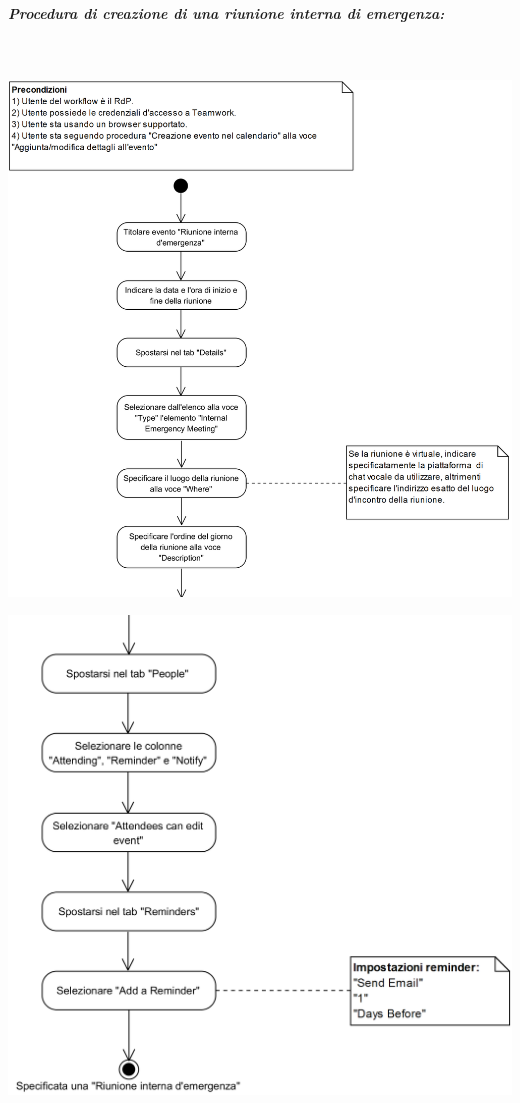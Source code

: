 \begin{samepage}
	\subparagraph{Procedura di creazione di una riunione interna di emergenza:}\mbox{}\\
	
	\begin{center}
		\includegraphics[width=15cm]{../../documenti/NormeDiProgetto/DiagrammiProcedure/RiunioneInternaDiEmergenza1.png}
	\end{center}
\end{samepage}
\begin{center}
	\includegraphics[width=15cm]{../../documenti/NormeDiProgetto/DiagrammiProcedure/RiunioneInternaDiEmergenza2.png}
\end{center}

